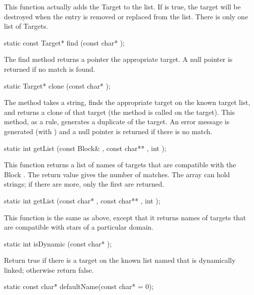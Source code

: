 This function actually adds the Target to the list.  If  is true,
the target will be destroyed when the entry is removed or replaced from
the list.  There is only one list of Targets.

\begin{example}
static const Target* find (const char* );
\end{example}

The find method returns a pointer the appropriate target.
A null pointer is returned if no match
is found.

\begin{example}
static Target* clone (const char* );
\end{example}

The  method takes a string, finds the appropriate target on
the known target list, and returns a clone of that target (the
 method is called on the target).  This method, as
a rule, generates a duplicate of the target.
An error message is generated (with ) and
a null pointer is returned if there is no match.

\begin{example}
static int getList (const Block& , const char** , int );
\end{example}

This function returns a list of names of targets that are compatible
with the Block .  The return value gives the number of matches.
The  array can hold  strings; if there are more,
only the first  are returned.

\begin{example}
static int getList (const char* , const char** , int );
\end{example}

This function is the same as above, except that it returns names of
targets that are compatible with stars of a particular domain.

\begin{example}
static int isDynamic (const char* );
\end{example}

Return true if there is a target on the known list named 
that is dynamically linked; otherwise return false.

\begin{example}
static const char* defaultName(const char*  = 0);
\end{example}

